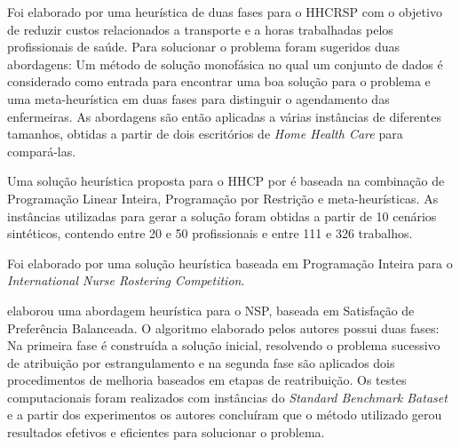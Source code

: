
Foi elaborado por \cite{Decerle:2016} uma heurística de duas fases para o \ac{HHCRSP} com o objetivo de reduzir custos relacionados a transporte e a horas trabalhadas pelos profissionais de saúde. Para solucionar o problema foram sugeridos duas abordagens: Um método de solução monofásica no qual um conjunto de dados é considerado como entrada para encontrar uma boa solução para o problema e uma meta-heurística em duas fases para distinguir o agendamento das enfermeiras. As abordagens são então aplicadas a várias instâncias de diferentes tamanhos, obtidas a partir de dois escritórios de \textit{Home Health Care} para compará-las.

Uma solução heurística proposta para o \ac{HHCP} por \cite{Bertels:2006} é baseada na combinação de Programação Linear Inteira, Programação por Restrição e meta-heurísticas. As instâncias utilizadas para gerar a solução foram obtidas a partir de 10 cenários sintéticos, contendo entre 20 e 50 profissionais e entre 111 e 326 trabalhos.

Foi elaborado por \cite{gambini:2012} uma solução heurística baseada em Programação Inteira para o \textit{International Nurse Rostering Competition}.



\cite{constantino:2011} elaborou uma abordagem heurística para o \ac{NSP}, baseada em Satisfação de Preferência Balanceada. O algoritmo elaborado pelos autores possui duas fases: Na primeira fase é construída a solução inicial, resolvendo o problema sucessivo de atribuição por estrangulamento e na segunda fase são aplicados dois procedimentos de melhoria baseados em etapas de reatribuição. Os testes computacionais foram realizados com instâncias do \textit{Standard Benchmark Bataset} e a partir dos experimentos os autores concluíram que o método utilizado gerou resultados efetivos e eficientes para solucionar o problema.

